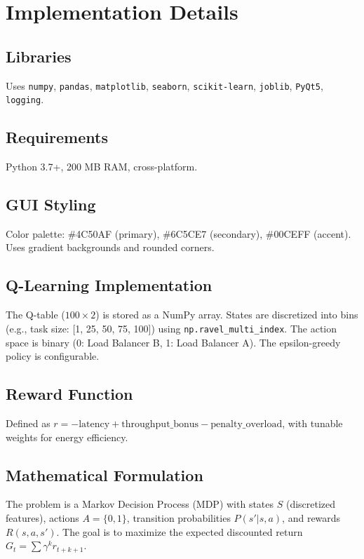 \documentclass[runningheads]{llncs}
\begin{document}
\section{Implementation Details}\label{implementation-details}

\subsection{Libraries}\label{dependencies}
Uses \texttt{numpy}, \texttt{pandas}, \texttt{matplotlib}, \texttt{seaborn}, \texttt{scikit-learn}, \texttt{joblib}, \texttt{PyQt5}, \texttt{logging}.

\subsection{Requirements}\label{requirements}
Python 3.7+, 200 MB RAM, cross-platform.

\subsection{GUI Styling}\label{gui-styling}
Color palette: \#4C50AF (primary), \#6C5CE7 (secondary), \#00CEFF (accent). Uses gradient backgrounds and rounded corners.

\subsection{Q-Learning Implementation}\label{q-learning-implementation}
The Q-table ($100 \times 2$) is stored as a NumPy array. States are discretized into bins (e.g., task size: [1, 25, 50, 75, 100]) using \texttt{np.ravel_multi_index}. The action space is binary (0: Load Balancer B, 1: Load Balancer A). The epsilon-greedy policy is configurable.

\subsection{Reward Function}
Defined as $r = -\text{latency} + \text{throughput_bonus} - \text{penalty_overload}$, with tunable weights for energy efficiency.

\subsection{Mathematical Formulation}
The problem is a Markov Decision Process (MDP) with states $S$ (discretized features), actions $A = \{0, 1\}$, transition probabilities $P(s'|s,a)$, and rewards $R(s,a,s')$. The goal is to maximize the expected discounted return $G_t = \sum \gamma^k r_{t+k+1}$.
\end{document}
